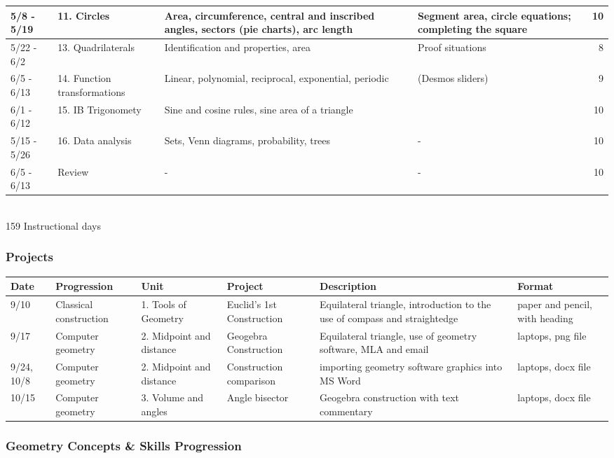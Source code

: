 \documentclass[12pt, twoside]{article}
\begin{document}
\begin{tabular}{|p{2.9cm}|p{4.7cm}|p{8cm}|p{5cm}|r|}
  \hline
  5/8 - 5/19  & 11. Circles & Area, circumference, central and inscribed angles, sectors (pie charts), arc length & Segment area, circle equations; completing the square & 10\\
  \hline
  5/22 - 6/2 & 13. Quadrilaterals & Identification and properties, area & Proof situations & 8 \\
  \hline
  6/5 - 6/13 & 14. Function transformations & Linear, polynomial, reciprocal, exponential, periodic & (Desmos sliders) & 9 \\
  \hline
  6/1 - 6/12 & 15. IB Trigonomety & Sine and cosine rules, sine area of a triangle & & 10 \\
  \hline
  5/15 - 5/26 & 16. Data analysis & Sets, Venn diagrams, probability, trees & - & 10 \\
  \hline
  6/5 - 6/13 & Review & - & - & 10 \\
  \hline
\end{tabular} \\[0.25cm]
159 Instructional days

\newpage
\subsubsection*{Projects}

\begin{tabular}{|p{1cm}|p{2.5cm}|p{3cm}|p{4cm}|p{8cm}|p{4cm}|}
  \hline
  Date & Progression & Unit & Project & Description & Format \\
  \hline
  9/10 & Classical construction & 1. Tools of Geometry & Euclid's 1st Construction & Equilateral triangle, introduction to the use of compass and straightedge & paper and pencil, with heading \\
  \hline
  9/17 & Computer geometry & 2. Midpoint and distance & Geogebra Construction & Equilateral triangle, use of geometry software, MLA and email & laptops, png file \\
  \hline
  9/24, 10/8 & Computer geometry & 2. Midpoint and distance & Construction comparison & importing geometry software graphics into MS Word & laptops, docx file \\
  \hline
  10/15 & Computer geometry & 3. Volume and angles & Angle bisector & Geogebra construction with text commentary & laptops, docx file \\
  \hline
\end{tabular}

\newpage
\subsubsection*{Geometry Concepts \& Skills Progression}
\end{document}
